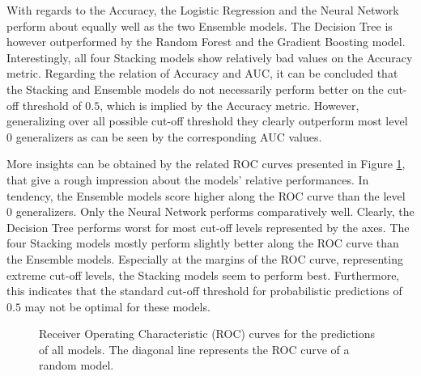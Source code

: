 \documentclass[12pt]{article}
\begin{document}
With regards to the Accuracy, the Logistic Regression and the Neural Network perform about equally well as the two Ensemble models. The Decision Tree is however outperformed by the Random Forest and the Gradient Boosting model. Interestingly, all four Stacking models show relatively bad values on the Accuracy metric. Regarding the relation of Accuracy and AUC, it can be concluded that the Stacking and Ensemble models do not necessarily perform better on the cut-off threshold of $0.5$, which is implied by the Accuracy metric. However, generalizing over all possible cut-off threshold they clearly outperform most level 0 generalizers as can be seen by the corresponding AUC values. 

More insights can be obtained by the related ROC curves presented in Figure \ref{aucplot}, that give a rough impression about the models' relative performances. In tendency, the Ensemble models score higher along the ROC curve than the level 0 generalizers. Only the Neural Network performs comparatively well. Clearly, the Decision Tree performs worst for most cut-off levels represented by the axes. The four Stacking models mostly perform slightly better along the ROC curve than the Ensemble models. Especially at the margins of the ROC curve, representing extreme cut-off levels, the Stacking models seem to perform best. Furthermore, this indicates that the standard cut-off threshold for probabilistic predictions of $0.5$ may not be optimal for these models.

\begin{figure}[!htp] 
\caption[ROC Curves]{Receiver Operating Characteristic (ROC) curves for the predictions of all models. The diagonal line represents the ROC curve of a random model.}\label{aucplot}
\end{figure} 
\end{document}
